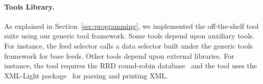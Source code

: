 \paragraph*{Tools Library.}
As explained in Section~\ref{sec:programming}, we implemented the
\padsd{} off-the-shelf tool suite using our generic tool framework. 
Some tools depend upon auxiliary tools.  
For instance, the feed selector calls a data selector built under
the \padsml{} generic tools framework \cite{padsml-padl} for base feeds.
Other tools depend upon external libraries. For instance, the
 tool requires the RRD round-robin database~\cite{rrdtool} and
the  tool uses the XML-Light package~\cite{xmllight} for
parsing and printing XML.

